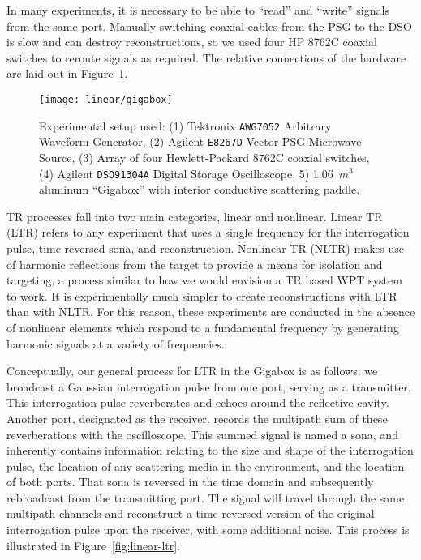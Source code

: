 In many experiments, it is necessary to be able to ``read'' and ``write'' signals from the same port. Manually switching coaxial cables from the PSG to the DSO is slow and can destroy reconstructions, so we used four HP 8762C coaxial switches to reroute signals as required. The relative connections of the hardware are laid out in Figure~\ref{fig:linear-gigabox}.

\begin{figure}[h!]
\centering
\texttt{[image: linear/gigabox]}
    \caption[Experimental Setup]{Experimental setup used: (1) Tektronix \texttt{AWG7052} Arbitrary Waveform Generator, (2) Agilent \texttt{E8267D} Vector PSG Microwave Source, (3) Array of four Hewlett-Packard 8762C coaxial switches, (4) Agilent \texttt{DSO91304A} Digital Storage Oscilloscope, 5) 1.06~$m^3$ aluminum ``Gigabox'' with interior conductive scattering paddle.}
    \label{fig:linear-gigabox}
\end{figure}

TR processes fall into two main categories, linear and nonlinear. Linear TR (LTR) refers to any experiment that uses a single frequency for the interrogation pulse, time reversed sona, and reconstruction. Nonlinear TR (NLTR) makes use of harmonic reflections from the target to provide a means for isolation and targeting, a process similar to how we would envision a TR based WPT system to work.  It is experimentally much simpler to create reconstructions with LTR than with NLTR. For this reason, these experiments are conducted in the absence of nonlinear elements which respond to a fundamental frequency by generating harmonic signals at a variety of frequencies.

Conceptually, our general process for LTR in the Gigabox is as follows: we broadcast a Gaussian interrogation pulse from one port, serving as a transmitter. This interrogation pulse reverberates and echoes around the reflective cavity. Another port, designated as the receiver, records the multipath sum of these reverberations with the oscilloscope. This summed signal is named a sona, and inherently contains information relating to the size and shape of the interrogation pulse, the location of any scattering media in the environment, and the location of both ports. That sona is reversed in the time domain and subsequently rebroadcast from the transmitting port. The signal will travel through the same multipath channels and reconstruct a time reversed version of the original interrogation pulse upon the receiver, with some additional noise. This process is illustrated in Figure~\ref{fig:linear-ltr}.

